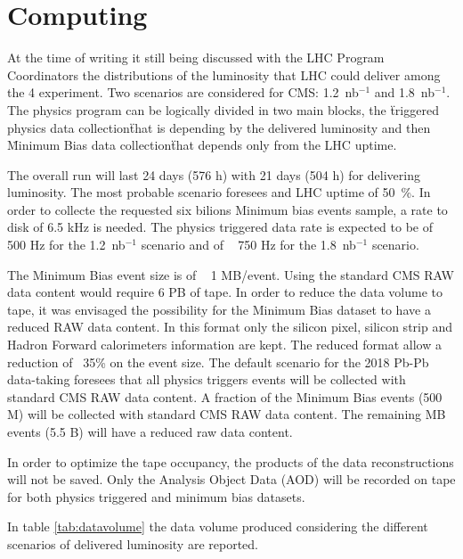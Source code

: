 \section{Computing}
\label{sec:computing}

At the time of writing it still being discussed with the LHC Program Coordinators the distributions of the luminosity that LHC could deliver among the 4 experiment.
Two scenarios are considered for CMS: 1.2~nb$^{-1}$ and 1.8~nb$^{-1}$.
The physics program can be logically divided in two main blocks, the \"triggered physics data collection\" that is depending by the delivered luminosity and then \"Minimum Bias data collection\" that depends only from the LHC uptime. 

The overall run will last 24 days (576 h) with 21 days (504 h) for delivering luminosity. 
The most probable scenario foresees and LHC uptime of 50~\%. In order to collecte the requested six bilions Minimum bias events sample, a rate to disk of 6.5 kHz is needed. 
The physics triggered data rate is expected to be of ~ 500 Hz for the 1.2~nb$^{-1}$ scenario and of ~ 750 Hz for the 1.8~nb$^{-1}$ scenario. 

The Minimum Bias event size is of ~ 1 MB/event. Using the standard CMS RAW data content would require 6 PB of tape. In order to reduce the data volume to tape, it was envisaged the possibility for the Minimum Bias dataset to have a reduced RAW data content. In this format only the silicon pixel, silicon strip and Hadron Forward calorimeters information are kept. The reduced format allow a reduction of ~35\% on the event size.  The default scenario for the 2018 Pb-Pb data-taking foresees that all physics triggers events will be collected with standard CMS RAW data content. A fraction of the Minimum Bias events (500 M) will be collected with standard CMS RAW data content. The remaining MB events (5.5 B) will have a reduced raw data content. 

In order to optimize the tape occupancy, the products of the data reconstructions will not be saved. Only the Analysis Object Data (AOD) will be recorded on tape for both physics triggered and minimum bias datasets. 

In table \ref{tab:datavolume} the data volume produced considering the different scenarios of delivered luminosity are reported.


